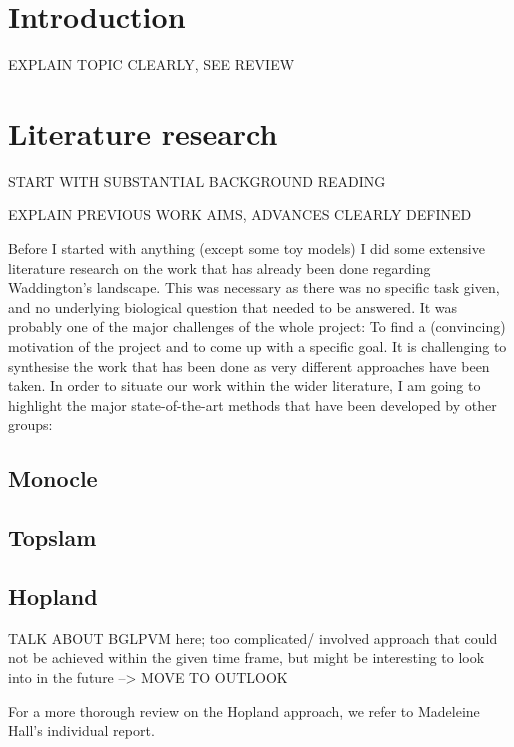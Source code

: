 \documentclass[journal, a4paper]{IEEEtran}
\begin{document}
\section{Introduction}

EXPLAIN TOPIC CLEARLY, SEE REVIEW 

\section{Literature research}

START WITH SUBSTANTIAL BACKGROUND READING

EXPLAIN PREVIOUS WORK
AIMS, ADVANCES CLEARLY DEFINED

Before I started with anything (except some toy models) I did some extensive literature research on the work that has already been done regarding Waddington's landscape. This was necessary as there was no specific task given, and no underlying biological question that needed to be answered. It was probably one of the major challenges of the whole project: To find a (convincing) motivation of the project and to come up with a specific goal.
It is challenging to synthesise the work that has been done as very different approaches have been taken. In order to situate our work within the wider literature, I am going to highlight the major state-of-the-art methods that have been developed by other groups:

\subsection{Monocle}
\subsection{Topslam}
\subsection{Hopland}
TALK ABOUT BGLPVM here; too complicated/ involved approach that could not be achieved within the given time frame, but might be interesting to look into in the future --> MOVE TO OUTLOOK

For a more thorough review on the Hopland approach, we refer to Madeleine Hall's individual report.
\end{document}
